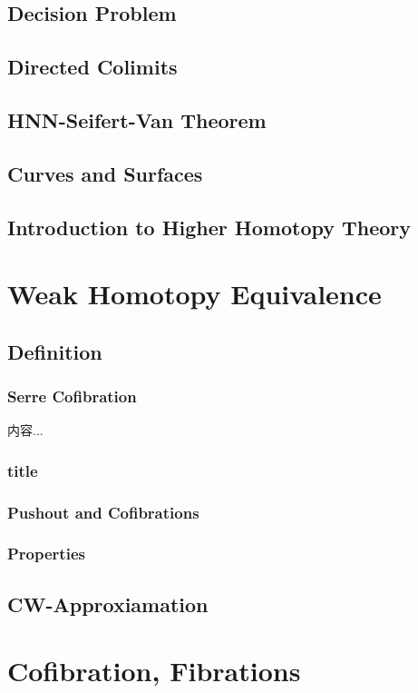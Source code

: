 \documentclass[Total.tex]{subfiles}
\begin{document}
		\section{Decision Problem}
		\section{Directed Colimits}
		\section{HNN-Seifert-Van Theorem}
		\section{Curves and Surfaces}
		\section{Introduction to Higher Homotopy Theory}
	\chapter{Weak Homotopy Equivalence}
		\section{Definition}	
			\begin{Def}
			\end{Def}
			\subsection{Serre Cofibration}
			\begin{Def}
				内容...
			\end{Def}
			\subsection{title}
			\subsection{Pushout and Cofibrations}
			\subsection{Properties}
		\section{CW-Approxiamation}
	\chapter{Cofibration, Fibrations} 
\end{document}
